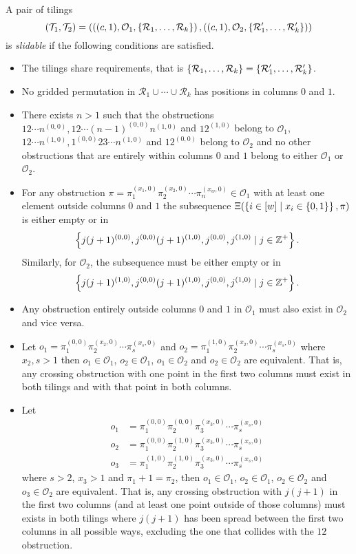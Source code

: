 \begin{definition}\label{def:slidable}
A pair of tilings
\[
    (\mathcal{T}_1,\mathcal{T}_2) = \left(\left((c,1), \mathcal{O}_1, \left\{\mathcal{R}_1,\ldots,\mathcal{R}_k\right\}\right), \left((c,1), \mathcal{O}_2, \left\{\mathcal{R}'_1,\ldots,\mathcal{R}'_k\right\}\right)\right)
\]
is \emph{slidable} if the following conditions are satisfied.
\begin{itemize}
    \item The tilings share requirements, that is $\left\{\mathcal{R}_1,\ldots,\mathcal{R}_k\right\}=\left\{\mathcal{R}'_1,\ldots,\mathcal{R}'_k\right\}$.
    \item No gridded permutation in $\mathcal{R}_1 \cup \cdots \cup \mathcal{R}_k$ has positions in columns $0$ and $1$.
    \item There exists $n>1$ such that the obstructions $12\cdots n^{(0,0)}, 12\cdots (n-1)^{(0,0)}n^{(1,0)}$ and $12^{(1,0)}$ belong to $\mathcal{O}_1$, $12\cdots n^{(1,0)}, 1^{(0,0)}23\cdots n^{(1,0)}$ and $12^{(0,0)}$ belong to $\mathcal{O}_2$ and no other obstructions that are entirely within columns $0$ and $1$ belong to either $\mathcal{O}_1$ or $\mathcal{O}_2$.
    \item For any obstruction $\pi = \pi_1^{(x_1,0)}\pi_2^{(x_2,0)}\cdots\pi_n^{(x_w,0)} \in \mathcal{O}_1$ with at least one element outside columns $0$ and $1$ the subsequence $\Xi(\left\{i \in [w] \mid x_i \in \left\{0,1\right\}\right\},\pi)$ is either empty or in 
    \[
         \left\{j(j+1)^{(0,0)}, j^{(0,0)}(j+1)^{(1,0)}, j^{(0,0)},j^{(1,0)} \mid j\in\mathbb{Z}^+\right\}.
    \]
    Similarly, for $\mathcal{O}_2$, the subsequence must be either empty or in 
    \[
         \left\{j(j+1)^{(1,0)}, j^{(0,0)}(j+1)^{(1,0)}, j^{(0,0)},j^{(1,0)} \mid j\in\mathbb{Z}^+\right\}.
    \]
    \item Any obstruction entirely outside columns $0$ and $1$ in $\mathcal{O}_1$ must also exist in $\mathcal{O}_2$ and vice versa.
    \item Let $o_1 = \pi_1^{(0,0)}\pi_2^{(x_2,0)}\cdots\pi_s^{(x_s,0)}$ and $o_2 = \pi_1^{(1,0)}\pi_2^{(x_2,0)}\cdots\pi_s^{(x_s,0)}$ where $x_2,s > 1$ then $o_1 \in \mathcal{O}_1$, $o_2 \in \mathcal{O}_1$, $o_1 \in \mathcal{O}_2$ and $o_2 \in \mathcal{O}_2$ are equivalent. That is, any crossing obstruction with one point in the first two columns must exist in both tilings and with that point in both columns.
    \item Let \begin{align*}o_1 &= \pi_1^{(0,0)}\pi_2^{(0,0)}\pi_3^{(x_3,0)}\cdots\pi_s^{(x_s,0)}\\o_2 &= \pi_1^{(0,0)}\pi_2^{(1,0)}\pi_3^{(x_3,0)}\cdots\pi_s^{(x_s,0)}\\o_3 &= \pi_1^{(1,0)}\pi_2^{(1,0)}\pi_3^{(x_3,0)}\cdots\pi_s^{(x_s,0)}\end{align*} where $s > 2$, $x_3 > 1$ and $\pi_1 + 1 = \pi_2$, then $o_1 \in \mathcal{O}_1$, $o_2 \in \mathcal{O}_1$, $o_2 \in \mathcal{O}_2$ and $o_3 \in \mathcal{O}_2$ are equivalent. That is, any crossing obstruction with $j(j+1)$ in the first two columns (and at least one point outside of those columns) must exists in both tilings where $j(j+1)$ has been spread between the first two columns in all possible ways, excluding the one that collides with the $12$ obstruction.

\end{itemize}
\end{definition}
